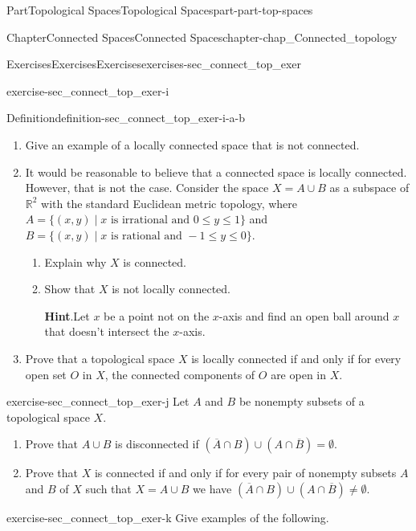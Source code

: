 \documentclass[oneside,10pt,]{book}
\newcommand{\blocktitlefont}{\relax}
\numberwithin{equation}{chapter}
\newcommand{\R}{\mathbb{R}}
\begin{document}
\begin{partptx}{Part}{Topological Spaces}{}{Topological Spaces}{}{}{part-part-top-spaces}
\begin{chapterptx}{Chapter}{Connected Spaces}{}{Connected Spaces}{}{}{chapter-chap_Connected_topology}
\begin{exercises-section}{Exercises}{Exercises}{}{Exercises}{}{}{exercises-sec_connect_top_exer}
\begin{divisionexercise}{9}{}{}{exercise-sec_connect_top_exer-i}
\begin{definition}{Definition}{}{definition-sec_connect_top_exer-i-a-b}
\end{definition}
\begin{enumerate}[font=\bfseries,label=(\alph*),ref=\alph*]%
\item{}Give an example of a locally connected space that is not connected.%
\item{}It would be reasonable to believe that a connected space is locally connected. However, that is not the case. Consider the space \(X = A \cup B\) as a subspace of \(\R^2\) with the standard Euclidean metric topology, where \(A = \{(x,y) \mid x \text{ is irrational and } 0 \leq y \leq 1\}\) and \(B = \{(x,y) \mid x \text{ is rational and } -1 \leq y \leq 0\}\).%
\begin{enumerate}[font=\bfseries,label=(\roman*),ref=\theenumi.\roman*]%
\item{}Explain why \(X\) is connected.%
\item{}Show that \(X\) is not locally connected.%
\par\smallskip%
\noindent\textbf{\blocktitlefont Hint}.\hypertarget{hint-sec_connect_top_exer-i-c-c-b}{}\quad{}Let \(x\) be a point not on the \(x\)-axis and find an open ball around \(x\) that doesn't intersect the \(x\)-axis.%
\end{enumerate}%
\item{}Prove that a topological space \(X\) is locally connected if and only if for every open set \(O\) in \(X\), the connected components of \(O\) are open in \(X\).%
\end{enumerate}%
\end{divisionexercise}%
\begin{divisionexercise}{10}{}{}{exercise-sec_connect_top_exer-j}%
Let \(A\) and \(B\) be nonempty subsets of a topological space \(X\).%
\begin{enumerate}[font=\bfseries,label=(\alph*),ref=\alph*]%
\item{}Prove that \(A \cup B\) is disconnected if \((\overline{A} \cap B ) \cup (A \cap \overline{B}) = \emptyset\).%
\item{}Prove that \(X\) is connected if and only if for every pair of nonempty subsets \(A\) and \(B\) of \(X\) such that \(X = A \cup B\) we have \((\overline{A} \cap B ) \cup (A \cap \overline{B}) \neq \emptyset\).%
\end{enumerate}%
\end{divisionexercise}%
\begin{divisionexercise}{11}{}{}{exercise-sec_connect_top_exer-k}%
Give examples of the following.%
\begin{enumerate}[font=\bfseries,label=(\alph*),ref=\alph*]%

\end{enumerate}
\end{divisionexercise}
\end{exercises-section}
\end{chapterptx}
\end{partptx}
\end{document}
